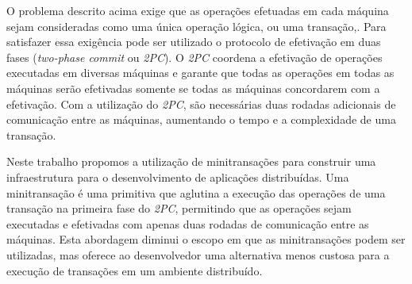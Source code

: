 \documentclass[11pt,twoside,a4paper]{book}
\begin{document}
O problema descrito acima exige que as operações efetuadas em cada máquina sejam consideradas como uma única operação lógica, ou uma transação,. Para satisfazer essa exigência pode ser utilizado o protocolo de efetivação em duas fases (\emph{two-phase commit} ou \emph{2PC}). O \emph{2PC} coordena a efetivação de operações executadas em diversas máquinas e garante que todas as operações em todas as máquinas serão efetivadas somente se todas as máquinas concordarem com a efetivação. Com a utilização do \emph{2PC}, são necessárias duas rodadas adicionais de comunicação entre as máquinas, aumentando o tempo e a complexidade de uma transação.


Neste trabalho propomos a utilização de minitransações para construir uma infraestrutura para o desenvolvimento de aplicações distribuídas. Uma minitransação é uma primitiva que aglutina a execução das operações de uma transação na primeira fase do \emph{2PC}, permitindo que as operações sejam executadas e efetivadas com apenas duas rodadas de comunicação entre as máquinas. Esta abordagem diminui o escopo em que as minitransações podem ser utilizadas, mas oferece ao desenvolvedor uma alternativa menos custosa para a execução de transações em um ambiente distribuído.

\end{document}
